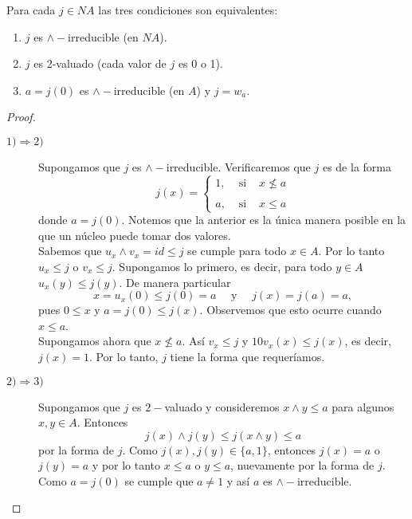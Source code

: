 \begin{lem}\label{Lema6.4.2}
    Para cada $j\in NA$ las tres condiciones son equivalentes:
    \begin{enumerate}
        \item $j$ es $\wedge-$irreducible (en $NA$).
        \item $j$ es 2-valuado (cada valor de $j$ es 0 o 1).
        \item $a=j(0)$ es $\wedge-$irreducible (en $A$) y $j=w_a$.
    \end{enumerate}
\end{lem}

\begin{proof}
    \begin{description}
        \item[$1)\Rightarrow 2)$] Supongamos que $j$ es $\wedge-$irreducible. Verificaremos que $j$ es de la forma 
        \[
        j(x)= \left\{ \begin{array}{lcc} 1, & \mbox{ si } & x \nleq a \\ \\  a, & \mbox{ si } & x \leq a \end{array} \right.
        \]
        donde $a=j(0)$. Notemos que la anterior es la única manera posible en la que un núcleo puede tomar dos valores.\\

        Sabemos que $u_x\wedge v_x=id\leq j$ se cumple para todo $x\in A$. Por lo tanto $u_x\leq j$ o $v_x\leq j$. Supongamos lo primero, es decir, para todo $y\in A$ $u_x(y)\leq j(y)$. De manera particular
        \[
        x=u_x(0)\leq j(0)=a\quad \mbox{ y }\quad j(x)=j(a)=a,
        \]
        pues $0\leq x$ y $a=j(0)\leq j(x)$. Observemos que esto ocurre cuando $x\leq a$.\\
        Supongamos ahora que $x\nleq a$. Así $v_x\leq j$ y $10v_x(x)\leq j(x)$, es decir, $j(x)=1$. Por lo tanto, $j$ tiene la forma que requeríamos.

        \item[$2)\Rightarrow 3)$] Supongamos que $j$ es $2-$valuado y consideremos $x\wedge y\leq a$ para algunos $x, y\in A$. Entonces
        \[
        j(x)\wedge j(y)\leq j(x\wedge y)\leq a
        \]
        por la forma de $j$. Como $j(x), j(y)\in \{a, 1\}$, entonces $j(x)=a$ o $j(y)=a$ y por lo tanto $x\leq a$ o $y\leq a$, nuevamente por la forma de $j$. Como $a=j(0)$ se cumple que $a\neq 1$ y así $a$ es $\wedge-$irreducible.\\


\end{description}
\end{proof}
